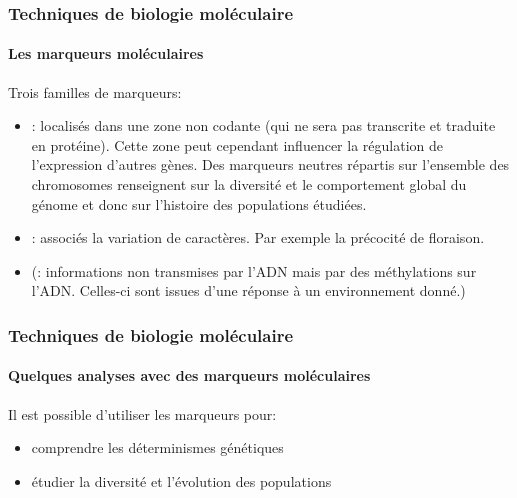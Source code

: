\begin{frame}
\frametitle{Techniques de biologie moléculaire}
\framesubtitle{Les marqueurs moléculaires}

Trois familles de marqueurs:

\begin{itemize}[<+->]
\item {}: localisés dans  une zone non codante (qui ne sera pas  transcrite et traduite en protéine).  Cette zone peut cependant influencer la  régulation de l’expression d’autres gènes.
Des marqueurs neutres répartis sur l’ensemble des chromosomes renseignent sur la diversité et le comportement global du génome et donc sur l’histoire des populations étudiées. 

\item {}: associés la variation de caractères.
Par exemple la précocité de floraison.

\item (: informations non transmises par l'ADN mais par des méthylations sur l'ADN. Celles-ci sont issues d'une réponse à un environnement donné.)

\end{itemize} 


\end{frame}


\begin{frame}
\frametitle{Techniques de biologie moléculaire}
\framesubtitle{Quelques analyses avec des marqueurs moléculaires}


Il est possible d'utiliser les marqueurs pour:

\begin{itemize}
\item comprendre les déterminismes génétiques
\item étudier la diversité et l'évolution des populations
\end{itemize}

\end{frame}



